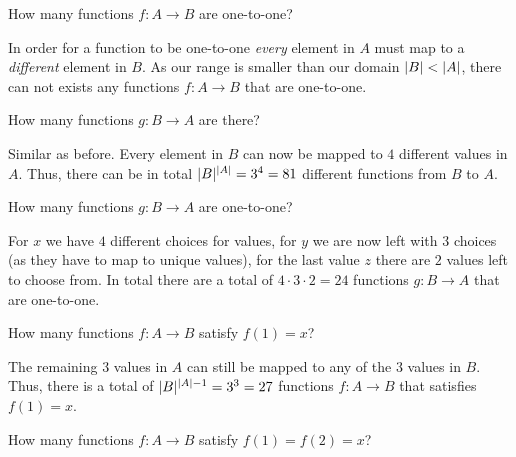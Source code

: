 \documentclass[a4paper, english, 12pt]{article} %
\begin{document}
\begin{subproblem}
  How many functions $f \colon A \to B$ are one-to-one?
\end{subproblem}

\begin{answer}
  In order for a function to be one-to-one \emph{every} element in $A$ must map to a
  \emph{different} element in $B$. As our range is smaller than our domain
  $\lvert B\rvert<\lvert A\rvert$, there can not exists any functions $f \colon A \to B$ that are one-to-one.
\end{answer}

\begin{subproblem}
  How many functions $g \colon B \to A$ are there?
\end{subproblem}

\begin{answer}
  Similar as before. Every element in $B$ can now be mapped to $4$ different
  values in $A$. Thus, there can be in total $\lvert B\rvert^{\lvert A\rvert}= 3^4 = 81$
  different functions from $B$ to $A$. 
\end{answer}

\begin{subproblem}
  How many functions $g \colon B \to A$ are one-to-one?
\end{subproblem}

\begin{answer}
  For $x$ we have $4$ different choices for values, for $y$ we are now left with
  $3$ choices (as they have to map to unique values), for the last value $z$
  there are $2$ values left to choose from. In total there are a total of $4
  \cdot 3 \cdot 2 = 24$ functions $g \colon B \to A$ that are one-to-one.
\end{answer}

\begin{subproblem}
  How many functions $f \colon A \to B$ satisfy $f(1) = x$?
\end{subproblem}

\begin{answer}
  The remaining $3$ values in $A$ can still be mapped to any of the $3$ values
  in $B$. Thus, there is a total of $\lvert B\rvert^{\lvert A\rvert-1} = 3^3 = 27$ functions
  $f \colon A \to B$ that satisfies $f(1) = x$.
\end{answer}

\begin{subproblem}
  How many functions $f \colon A \to B$ satisfy $f(1) = f(2) = x$?
\end{subproblem}
\end{document}
